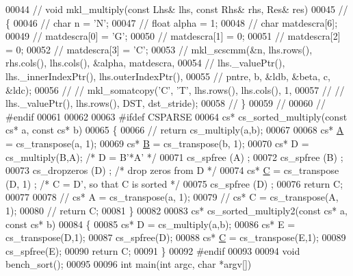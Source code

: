 \begin{DoxyCode}
00044 \textcolor{comment}{// void mkl\_multiply(const Lhs& lhs, const Rhs& rhs, Res& res)}
00045 \textcolor{comment}{// \{}
00046 \textcolor{comment}{//   char n = 'N';}
00047 \textcolor{comment}{//   float alpha = 1;}
00048 \textcolor{comment}{//   char matdescra[6];}
00049 \textcolor{comment}{//   matdescra[0] = 'G';}
00050 \textcolor{comment}{//   matdescra[1] = 0;}
00051 \textcolor{comment}{//   matdescra[2] = 0;}
00052 \textcolor{comment}{//   matdescra[3] = 'C';}
00053 \textcolor{comment}{//   mkl\_scscmm(&n, lhs.rows(), rhs.cols(), lhs.cols(), &alpha, matdescra,}
00054 \textcolor{comment}{//              lhs.\_valuePtr(), lhs.\_innerIndexPtr(), lhs.outerIndexPtr(),}
00055 \textcolor{comment}{//              pntre, b, &ldb, &beta, c, &ldc);}
00056 \textcolor{comment}{// //   mkl\_somatcopy('C', 'T', lhs.rows(), lhs.cols(), 1,}
00057 \textcolor{comment}{// //                 lhs.\_valuePtr(), lhs.rows(), DST, dst\_stride);}
00058 \textcolor{comment}{// \}}
00059 \textcolor{comment}{//}
00060 \textcolor{comment}{// #endif}
00061 
00062 
00063 \textcolor{preprocessor}{#ifdef CSPARSE}
00064 cs* cs\_sorted\_multiply(\textcolor{keyword}{const} cs* a, \textcolor{keyword}{const} cs* b)
00065 \{
00066 \textcolor{comment}{//   return cs\_multiply(a,b);}
00067 
00068   cs* \hyperlink{group___core___module_class_eigen_1_1_matrix}{A} = cs\_transpose(a, 1);
00069   cs* \hyperlink{group___core___module_class_eigen_1_1_matrix}{B} = cs\_transpose(b, 1);
00070   cs* D = cs\_multiply(B,A);   \textcolor{comment}{/* D = B'*A' */}
00071   cs\_spfree (A) ;
00072   cs\_spfree (B) ;
00073   cs\_dropzeros (D) ;      \textcolor{comment}{/* drop zeros from D */}
00074   cs* \hyperlink{group___core___module}{C} = cs\_transpose (D, 1) ;   \textcolor{comment}{/* C = D', so that C is sorted */}
00075   cs\_spfree (D) ;
00076   \textcolor{keywordflow}{return} C;
00077 
00078 \textcolor{comment}{//   cs* A = cs\_transpose(a, 1);}
00079 \textcolor{comment}{//   cs* C = cs\_transpose(A, 1);}
00080 \textcolor{comment}{//   return C;}
00081 \}
00082 
00083 cs* cs\_sorted\_multiply2(\textcolor{keyword}{const} cs* a, \textcolor{keyword}{const} cs* b)
00084 \{
00085   cs* D = cs\_multiply(a,b);
00086   cs* E = cs\_transpose(D,1);
00087   cs\_spfree(D);
00088   cs* \hyperlink{group___core___module}{C} = cs\_transpose(E,1);
00089   cs\_spfree(E);
00090   \textcolor{keywordflow}{return} C;
00091 \}
00092 \textcolor{preprocessor}{#endif}
00093 
00094 \textcolor{keywordtype}{void} bench\_sort();
00095 
00096 \textcolor{keywordtype}{int} main(\textcolor{keywordtype}{int} argc, \textcolor{keywordtype}{char} *argv[])

\end{DoxyCode}
